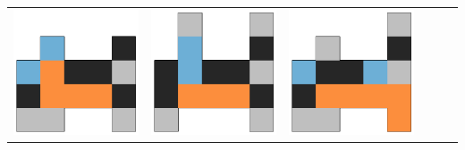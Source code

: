 \begin{tabular}{cccccc}
    \hline \rule{0pt}{9ex}  
    \includegraphics[scale=0.1]{images/top_designs/pusher/ga/exp3/gen29_ind0} &
    \includegraphics[scale=0.1]{images/top_designs/pusher/ga/exp3/gen29_ind1} &
    \includegraphics[scale=0.1]{images/top_designs/pusher/ga/exp3/gen29_ind2} &

\end{tabular}
